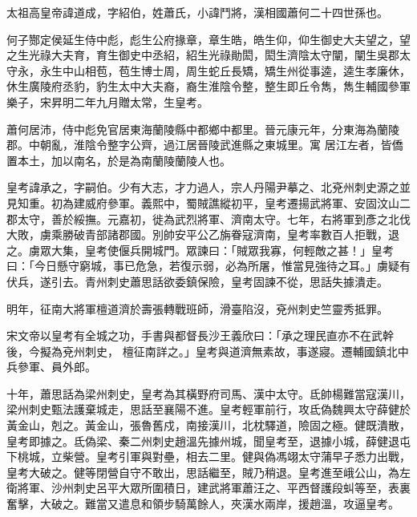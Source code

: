 
\begin{pinyinscope}

 太祖高皇帝諱道成，字紹伯，姓蕭氏，小諱鬥將，漢相國蕭何二十四世孫也。



 何子酂定侯延生侍中彪，彪生公府掾章，章生皓，皓生仰，仰生御史大夫望之，望之生光祿大夫育，育生御史中丞紹，紹生光祿勛閎，閎生濟陰太守闡，闡生吳郡太守永，永生中山相苞，苞生博士周，周生蛇丘長矯，矯生州從事逵，逵生孝廉休，休生廣陵府丞豹，豹生太中大夫裔，裔生淮陰令整，整生即丘令雋，雋生輔國參軍樂子，宋昇明二年九月贈太常，生皇考。



 蕭何居沛，侍中彪免官居東海蘭陵縣中都鄉中都里。晉元康元年，分東海為蘭陵郡。中朝亂，淮陰令整字公齊，過江居晉陵武進縣之東城里。寓
 居江左者，皆僑置本土，加以南名，於是為南蘭陵蘭陵人也。



 皇考諱承之，字嗣伯。少有大志，才力過人，宗人丹陽尹摹之、北兗州刺史源之並見知重。初為建威府參軍。義熙中，蜀賊譙縱初平，皇考遷揚武將軍、安固汶山二郡太守，善於綏撫。元嘉初，徙為武烈將軍、濟南太守。七年，右將軍到彥之北伐大敗，虜乘勝破青部諸郡國。別帥安平公乙旃眷寇濟南，皇考率數百人拒戰，退之。虜眾大集，皇考使偃兵開城門。眾諫曰：「賊眾我寡，何輕敵之甚！」皇考曰：「今日懸守窮城，事已危急，若復示弱，必為所屠，惟當見強待之耳。」虜疑有伏兵，遂引去。青州刺史蕭思話欲委鎮保險，皇考固諫不從，思話失據潰走。



 明年，征南大將軍檀道濟於壽張轉戰班師，滑臺陷沒，兗州刺史竺靈秀抵罪。



 宋文帝以皇考有全城之功，手書與都督長沙王義欣曰：「承之理民直亦不在武幹後，今擬為兗州刺史，
 檀征南詳之。」皇考與道濟無素故，事遂寢。遷輔國鎮北中兵參軍、員外郎。



 十年，蕭思話為梁州刺史，皇考為其橫野府司馬、漢中太守。氐帥楊難當寇漢川，梁州刺史甄法護棄城走，思話至襄陽不進。皇考輕軍前行，攻氐偽魏興太守薛健於黃金山，剋之。黃金山，張魯舊戍，南接漢川，北枕驛道，險固之極。健既潰散，皇考即據之。氐偽梁、秦二州刺史趙溫先據州城，聞皇考至，退據小城，薛健退屯下桃城，立柴營。皇考引軍與對壘，相去二里。健與偽馮翊太守蒲早子悉力出戰，皇考大破之。健等閉營自守不敢出，思話繼至，賊乃稍退。皇考進至峨公山，為左衛將軍、沙州刺史呂平大眾所圍積日，建武將軍蕭汪之、平西督護段虯等至，表裏奮擊，大破之。難當又遣息和領步騎萬餘人，夾漢水兩岸，援趙溫，攻逼皇考。




\end{pinyinscope}
